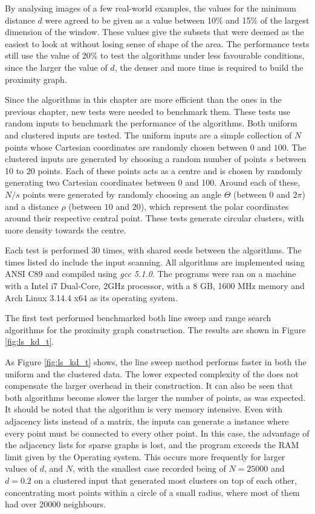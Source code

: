 
\begin{change}
By analysing images of a few real-world examples, the values for the minimum distance $d$ were agreed to be given as a value between 10\% and 15\% of the largest dimension of the window. These values give the subsets that were deemed as the easiest to look at without losing sense of shape of the area. The performance tests still use the value of 20\% to test the algorithms under less favourable conditions, since the larger the value of $d$, the denser and more time is required to build the proximity graph. 
\end{change}

Since the algorithms in this chapter are more efficient than the ones in the previous chapter, new tests were needed to benchmark them. These tests use random inputs to benchmark the performance of the algorithms. Both uniform and clustered inputs are tested. The uniform inputs are a simple collection of $N$ points whose Cartesian coordinates are randomly chosen between $0$ and $100$. The clustered inputs are generated by choosing a random number of points $s$ between 10 to 20 points. Each of these points acts as a centre and is chosen by randomly generating two Cartesian coordinates between 0 and 100. Around each of these, $N/s$ points were generated by randomly choosing an angle $\Theta$ (between $0$ and $2\pi$) and a distance $\rho$ (between $10$ and $20$), which represent the polar coordinates around their respective central point. These tests generate circular clusters, with more density towards the centre.

Each test is performed 30 times, with shared seeds between the algorithms. The times listed do include the input scanning. All algorithms are implemented using ANSI C89 and compiled using \emph{gcc 5.1.0}. The programs were ran on a machine with a Intel i7 Dual-Core, 2GHz processor, with a 8 GB, 1600 MHz memory and Arch Linux 3.14.4 x64 as its operating system.

The first test performed benchmarked both line sweep and \kdtree range search algorithms for the proximity graph construction. The results are shown in Figure \ref{fig:ls_kd_t}.



As Figure \ref{fig:ls_kd_t} shows, the line sweep method performs faster in both the uniform and the clustered data. The lower expected complexity of the \kdtrees does not compensate the larger overhead in their construction. It can also be seen that both algorithms become slower the larger the number of points, as was expected. It should be noted that the algorithm is very memory intensive. Even with adjacency lists instead of a matrix, the inputs can generate a instance where every point must be connected to every other point. In this case, the advantage of the adjacency lists for sparse graphs is lost, and the program exceeds the RAM limit given by the Operating system. This occurs more frequently for larger values of $d$, and $N$, with the smallest case recorded being of $N=25000$ and $d=0.2$ on a clustered input that generated most clusters on top of each other, concentrating most points within a circle of a small radius, where most of them had over 20000 neighbours. 

